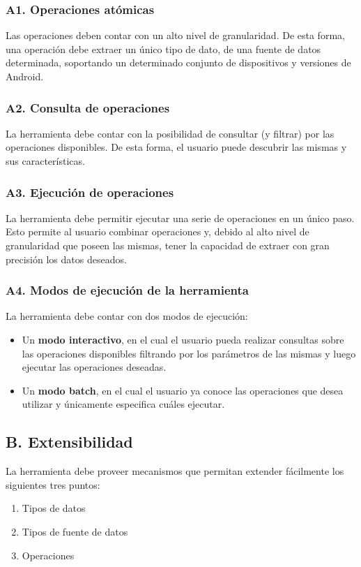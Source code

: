 \subsubsection*{A1. Operaciones atómicas}
\label{reqA1}
Las operaciones deben contar con un alto nivel de granularidad. De esta forma, una operación debe extraer un único tipo de dato, de una fuente de datos determinada, soportando un determinado conjunto de dispositivos y versiones de Android.

\subsubsection*{A2. Consulta de operaciones}
\label{reqA2}
La herramienta debe contar con la posibilidad de consultar (y filtrar) por las operaciones disponibles. De esta forma, el usuario puede descubrir las mismas y sus características.

\subsubsection*{A3. Ejecución de operaciones}
\label{reqA3}
La herramienta debe permitir ejecutar una serie de operaciones en un único paso. Esto permite al usuario combinar operaciones y, debido al alto nivel de granularidad que poseen las mismas, tener la capacidad de extraer con gran precisión los datos deseados.

\subsubsection*{A4. Modos de ejecución de la herramienta}
\label{reqA4}
La herramienta debe contar con dos modos de ejecución:
\begin{itemize}
\item Un \textbf{modo interactivo}, en el cual el usuario pueda realizar consultas sobre las operaciones disponibles filtrando por los parámetros de las mismas y luego ejecutar las operaciones deseadas.
\item Un \textbf{modo batch}, en el cual el usuario ya conoce las operaciones que desea utilizar y únicamente especifica cuáles ejecutar.
\end{itemize}

\subsection*{B. Extensibilidad}
\label{reqB}
La herramienta debe proveer mecanismos que permitan extender fácilmente los siguientes tres puntos:
\begin{enumerate}
\item Tipos de datos
\item Tipos de fuente de datos
\item Operaciones
\end{enumerate}

